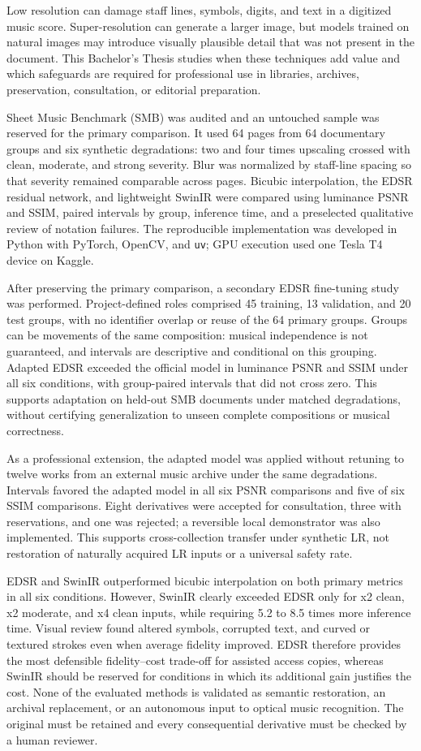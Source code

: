 Low resolution can damage staff lines, symbols, digits, and text in a digitized music score.
Super-resolution can generate a larger image, but models trained on natural images may introduce
visually plausible detail that was not present in the document. This Bachelor's Thesis studies
when these techniques add value and which safeguards are required for professional use in
libraries, archives, preservation, consultation, or editorial preparation.

Sheet Music Benchmark (SMB) was audited and an untouched sample was reserved for the primary
comparison. It used 64 pages from 64 documentary groups and six synthetic degradations: two
and four times upscaling crossed with clean, moderate, and strong severity. Blur was normalized by
staff-line spacing so that severity remained comparable across pages. Bicubic interpolation, the
EDSR residual network, and lightweight SwinIR were compared using luminance PSNR and SSIM,
paired intervals by group, inference time, and a preselected qualitative review of notation
failures. The reproducible implementation was developed in Python with PyTorch, OpenCV, and
\texttt{uv}; GPU execution used one Tesla T4 device on Kaggle.

After preserving the primary comparison, a secondary EDSR fine-tuning study was performed.
Project-defined roles comprised 45 training, 13 validation, and 20 test groups, with no identifier
overlap or reuse of the 64 primary groups. Groups can be movements of the same composition:
musical independence is not guaranteed, and intervals are descriptive and conditional on this
grouping. Adapted EDSR exceeded the official model in luminance PSNR and SSIM under all six
conditions, with group-paired intervals that did not cross zero. This supports adaptation on
held-out SMB documents under matched degradations, without certifying generalization to unseen
complete compositions or musical correctness.

As a professional extension, the adapted model was applied without retuning to twelve works from
an external music archive under the same degradations. Intervals favored the adapted model in all
six PSNR comparisons and five of six SSIM comparisons. Eight derivatives were accepted for
consultation, three with reservations, and one was rejected; a reversible local demonstrator was
also implemented. This supports cross-collection transfer under synthetic LR, not restoration of
naturally acquired LR inputs or a universal safety rate.

EDSR and SwinIR outperformed bicubic interpolation on both primary metrics in all six conditions.
However, SwinIR clearly exceeded EDSR only for x2 clean, x2 moderate, and x4 clean inputs, while
requiring 5.2 to 8.5 times more inference time. Visual review found altered symbols, corrupted text,
and curved or textured strokes even when average fidelity improved. EDSR therefore provides the
most defensible fidelity--cost trade-off for assisted access copies, whereas SwinIR should be
reserved for conditions in which its additional gain justifies the cost. None of the evaluated
methods is validated as semantic restoration, an archival replacement, or an autonomous input to
optical music recognition. The original must be retained and every consequential derivative must
be checked by a human reviewer.

